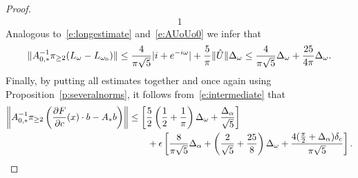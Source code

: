 \begin{proof}
\begin{alignat*}{1}
\end{alignat*}
Analogous to~\eqref{e:longestimate} and~\eqref{e:AUoUo0} we infer that
\begin{equation*}
	\|  A_{0,*}^{-1} \pi_{\geq 2} ( L_{\omega} - L_{\omega_0} ) \| \leq  \frac{4}{\pi \sqrt{5}} |i+ e^{-i \omega} | + \frac{5}{\pi} \| \hat{U} \| \Delta_\omega \\
	\leq  \frac{4 }{\pi \sqrt{5}}\Delta_\omega    + \frac{25}{4 \pi}  \Delta_\omega .
\end{equation*} 
Finally, by putting all estimates together and once again using Proposition~\ref{p:severalnorms}, it follows from~\eqref{e:intermediate} that 
	\begin{alignat*}{1}
\left\| A_{0,*}^{-1} \pi_{\geq 2} \left(   \frac{\partial F}{\partial c} (x) \cdot b -  A_* b  \right)  \right\|
	&\leq
	 \left[ \frac{5}{2} \left( \frac{1}{2} + \frac{1}{\pi} \right) \Delta_\omega +  \frac{\Delta_\alpha }{\sqrt{5}} \right] 
	 \\
	& \qquad  +\epsilon \left[ \frac{8}{\pi \sqrt{5}} \Delta_\alpha + \left(  \frac{2}{\sqrt{5}}   + \frac{25}{8} \right) \Delta_\omega + \frac{4 (\tfrac{\pi}{2}+\Delta_\alpha)  \delta_c}{\pi \sqrt{5}} \right] .
	\end{alignat*}
\end{proof}




